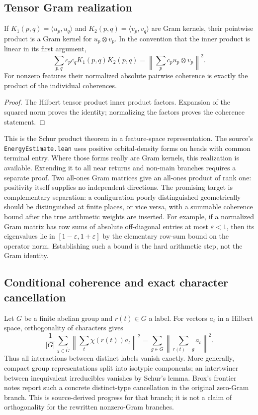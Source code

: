 \documentclass[11pt,a4paper]{article}
\begin{document}
\subsection{Tensor Gram realization}
\begin{proposition}
If $K_1(p,q)=\langle u_p,u_q\rangle$ and $K_2(p,q)=\langle v_p,v_q\rangle$ are Gram kernels, their pointwise product is a Gram kernel for $u_p\otimes v_p$. In the convention that the inner product is linear in its first argument,
\begin{equation}\label{eq:tensor}
\sum_{p,q}c_p\overline{c_q}K_1(p,q)K_2(p,q)=\left\|\sum_p c_p u_p\otimes v_p\right\|^2.
\end{equation}
For nonzero features their normalized absolute pairwise coherence is exactly the product of the individual coherences.
\end{proposition}
\begin{proof}The Hilbert tensor product inner product factors. Expansion of the squared norm proves the identity; normalizing the factors proves the coherence statement.\end{proof}
This is the Schur product theorem in a feature-space representation. The source's \texttt{EnergyEstimate.lean} uses positive orbital-density forms on heads with common terminal entry. Where those forms really are Gram kernels, this realization is available. Extending it to all near returns and non-main branches requires a separate proof. Two all-ones Gram matrices give an all-ones product of rank one: positivity itself supplies no independent directions. The promising target is complementary separation: a configuration poorly distinguished geometrically should be distinguished at finite places, or vice versa, with a summable coherence bound after the true arithmetic weights are inserted. For example, if a normalized Gram matrix has row sums of absolute off-diagonal entries at most $\varepsilon<1$, then its eigenvalues lie in $[1-\varepsilon,1+\varepsilon]$ by the elementary row-sum bound on the operator norm. Establishing such a bound is the hard arithmetic step, not the Gram identity.

\subsection{Conditional coherence and exact character cancellation}
Let $G$ be a finite abelian group and $r(t)\in G$ a label. For vectors $a_t$ in a Hilbert space, orthogonality of characters gives
\begin{equation}\label{eq:char}
\frac1{|G|}\sum_{\chi\in\widehat G}\left\|\sum_t\chi(r(t))a_t\right\|^2
=\sum_{g\in G}\left\|\sum_{r(t)=g}a_t\right\|^2.
\end{equation}
Thus all interactions between distinct labels vanish exactly. More generally, compact group representations split into isotypic components; an intertwiner between inequivalent irreducibles vanishes by Schur's lemma. Brox's frontier notes \cite{broxfrontier} report such a concrete distinct-type cancellation in the original zero-Gram branch. This is source-derived progress for that branch; it is not a claim of orthogonality for the rewritten nonzero-Gram branches.
\end{document}
